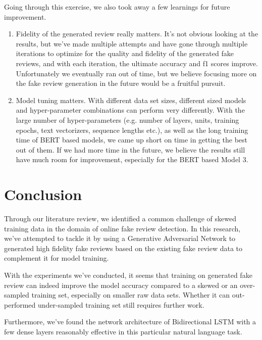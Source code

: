 \documentclass[conference, 11pt]{IEEEtran} %
\theoremstyle{plain}
\theoremstyle{definition}
\begin{document}
Going through this exercise, we also took away a few learnings for future improvement.
\begin{enumerate}
\item Fidelity of the generated review really matters. It's not obvious looking at the results, but we've made multiple attempts and have gone through multiple iterations to optimize for the quality and fidelity of the generated fake reviews, and with each iteration, the ultimate accuracy and f1 scores improve. Unfortunately we eventually ran out of time, but we believe focusing more on the fake review generation in the future would be a fruitful pursuit.
\item Model tuning matters. With different data set sizes, different sized models and hyper-parameter combinations can perform very differently. With the large number of hyper-parameters (e.g. number of layers, units, training epochs, text vectorizers, sequence lengths etc.), as well as the long training time of BERT based models, we came up short on time in getting the best out of them. If we had more time in the future, we believe the results still have much room for improvement, especially for the BERT based Model 3.
\end{enumerate}


\section{Conclusion}
\label{conclusion}
Through our literature review, we identified a common challenge of skewed training data in the domain of online fake review detection. In this research, we've attempted to tackle it by using a Generative Adversarial Network to generated high fidelity fake reviews based on the existing fake review data to complement it for model training.

With the experiments we've conducted, it seems that training on generated fake review can indeed improve the model accuracy compared to a skewed or an over-sampled training set, especially on smaller raw data sets. Whether it can out-performed under-sampled training set still requires further work.

Furthermore, we've found the network architecture of Bidirectional LSTM with a few dense layers reasonably effective in this particular natural language task.



\balance
\nocite{*}

\end{document}
